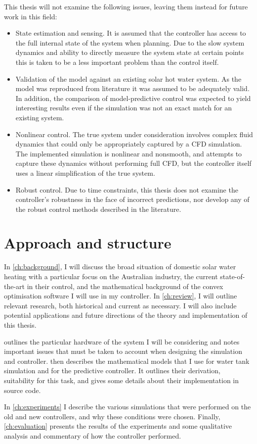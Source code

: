 This thesis will not examine the following issues, leaving them instead for future work in this field:

\begin{itemize}
   \item State estimation and sensing.
         It is assumed that the controller has access to the full internal state of the system when planning.
         Due to the slow system dynamics and ability to directly measure the system state at certain points this is taken to be a less important problem than the control itself.
   \item Validation of the model against an existing solar hot water system.
         As the model was reproduced from literature it was assumed to be adequately valid.
         In addition, the comparison of model-predictive control was expected to yield interesting results even if the simulation was not an exact match for an existing system.
   \item Nonlinear control.
         The true system under consideration involves complex fluid dynamics that could only be appropriately captured by a CFD simulation.
         The implemented simulation is nonlinear and nonsmooth, and attempts to capture these dynamics without performing full CFD, but the controller itself uses a linear simplification of the true system.
   \item Robust control.
         Due to time constraints, this thesis does not examine the controller's robustness in the face of incorrect predictions, nor develop any of the robust control methods described in the literature.
\end{itemize}

\section{Approach and structure}


In \autoref{ch:background}, I will discuss the broad situation of domestic solar water heating with a particular focus on the Australian industry, the current state-of-the-art in their control, and the mathematical background of the convex optimisation software I will use in my controller.
In \autoref{ch:review}, I will outline relevant research, both historical and current as necessary.
I will also include potential applications and future directions of the theory and implementation of this thesis.

 outlines the particular hardware of the system I will be considering and notes important issues that must be taken to account when designing the simulation and controller.
 then describes the mathematical models that I use for water tank simulation and for the predictive controller.
It outlines their derivation, suitability for this task, and gives some details about their implementation in source code.

In \autoref{ch:experiments} I describe the various simulations that were performed on the old and new controllers, and why these conditions were chosen.
Finally, \autoref{ch:evaluation} presents the results of the experiments and some qualitative analysis and commentary of how the controller performed.
